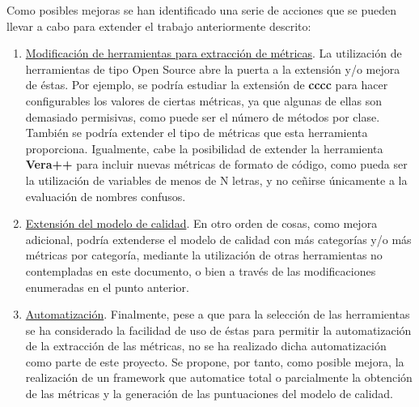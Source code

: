 \documentclass[11pt]{article}
\begin{document}
Como posibles mejoras se han identificado una serie de acciones que se pueden llevar a cabo para extender el trabajo anteriormente descrito:
\begin{enumerate}
\item{\underline{Modificación de herramientas para extracción de métricas}}. La utilización de herramientas de tipo Open Source abre la puerta a la extensión y/o mejora de éstas. Por ejemplo, se podría estudiar la extensión de \textbf{cccc} para hacer configurables los valores de ciertas métricas, ya que algunas de ellas son demasiado permisivas, como puede ser el número de métodos por clase. También se podría extender el tipo de métricas que esta herramienta proporciona.
Igualmente, cabe la posibilidad de extender la herramienta \textbf{Vera++} para incluir nuevas métricas de formato de código, como pueda ser la utilización de variables de menos de N letras, y no ceñirse únicamente a la evaluación de nombres confusos.
\item{\underline{Extensión del modelo de calidad}}. En otro orden de cosas, como mejora adicional, podría extenderse el modelo de calidad con más categorías y/o más métricas por categoría, mediante la utilización de otras herramientas no contempladas en este documento, o bien a través de las modificaciones enumeradas en el punto anterior.
\item{\underline{Automatización}}. Finalmente, pese a que para la selección de las herramientas se ha considerado la facilidad de uso de éstas para permitir la automatización de la extracción de las métricas, no se ha realizado dicha automatización como parte de este proyecto. Se propone, por tanto, como posible mejora, la realización de un framework que automatice total o parcialmente la obtención de las métricas y la generación de las puntuaciones del modelo de calidad.
\end{enumerate}

\pagebreak



\label{Bibliography}
\end{document}
